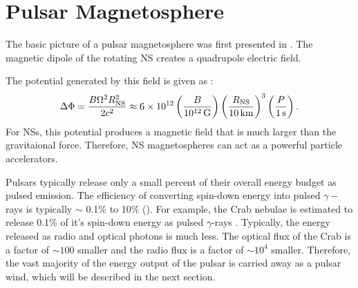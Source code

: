 \section{Pulsar Magnetosphere}

The basic picture of a pulsar magnetosphere was first presented in
\cite{goldreich_1969_pulsar-electrodynamics}.  The magnetic dipole of
the rotating \ac{NS} creates a quadrupole electric field.

The potential generated by this field is given as
\citep{goldreich_1969_pulsar-electrodynamics}:
\begin{equation}
\Delta \Phi = \frac{B \Omega^2 R_\text{NS}^2}{2c^2}
\approx 6\times 10^{12} 
\left(\frac{B}{10^{12}\,\text{G}}\right)
\left(\frac{R_\text{NS}}{10\,\text{km}}\right)^3
\left(\frac{P}{1\,\text{s}}\right).
\end{equation}
For \acp{NS}, this potential produces a magnetic field that is much
larger than the gravitaional force. Therefore, \ac{NS} magnetospheres
can act as a powerful particle accelerators.


Pulsars typically release only a small percent of their overall
energy budget as pulsed emission. The efficiency of converting
spin-down energy into pulsed $\gamma-$rays is typically $\sim$
0.1\% to 10\% (\cite{abdo_2010a_first-fermi}).  For example, the
Crab nebulae is estimated to release 0.1\% of it's spin-down energy
as pulsed $\gamma$-rays \cite{abdo_2010a_fermi-large}.  Typically,
the energy released as radio and optical photons is much less.
The optical flux of the Crab is a factor of $\sim100$ smaller
\cite{cocke_1969_discovery-optical} and the radio flux is a factor of
$\sim 10^4$ smaller.  Therefore, the vast majority of the energy output
of the pulsar is carried away as a pulsar wind, which will be described
in the next section.

